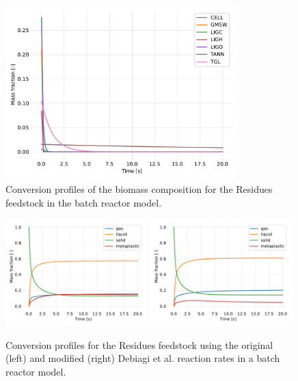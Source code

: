 \begin{figure}[H]
    \centering
    \includegraphics[width=0.8\textwidth]{figures/batch-biocomp.pdf}
    \caption{Conversion profiles of the biomass composition for the Residues feedstock in the batch reactor model.}
    \label{fig:batch-biocomp}
\end{figure}

\begin{figure}[H]
    \centering
    \includegraphics[width=0.49\textwidth]{figures/batch-products1.pdf}
    \includegraphics[width=0.49\textwidth]{figures/batch-products2.pdf}
    \caption{Conversion profiles for the Residues feedstock using the original (left) and modified (right) Debiagi et al. reaction rates in a batch reactor model.}
    \label{fig:batch-products}
\end{figure}

